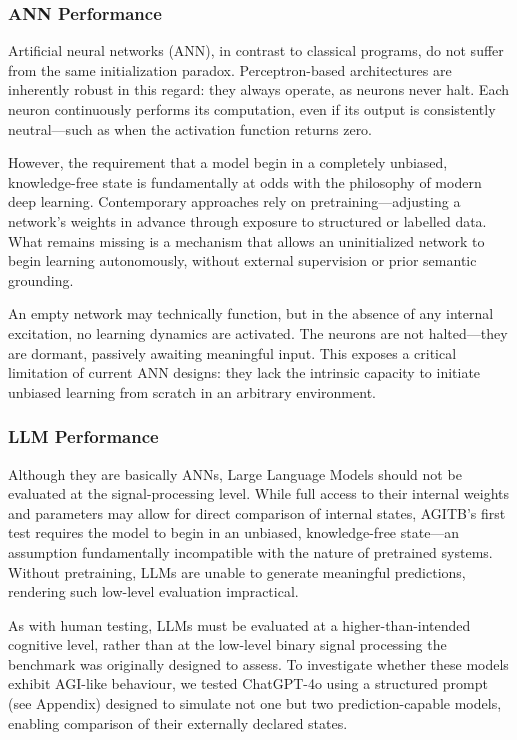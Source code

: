 \documentclass{article}
\begin{document}
	
	\subsubsection{ANN Performance}
	
	Artificial neural networks (ANN), in contrast to classical programs, do not suffer from the same initialization paradox. Perceptron-based architectures are inherently robust in this regard: they always operate, as neurons never halt. Each neuron continuously performs its computation, even if its output is consistently neutral—such as when the activation function returns zero.
	
	However, the requirement that a model begin in a completely unbiased, knowledge-free state is fundamentally at odds with the philosophy of modern deep learning. Contemporary approaches rely on pretraining—adjusting a network’s weights in advance through exposure to structured or labelled data. What remains missing is a mechanism that allows an uninitialized network to begin learning autonomously, without external supervision or prior semantic grounding.
	
	An empty network may technically function, but in the absence of any internal excitation, no learning dynamics are activated. The neurons are not halted—they are dormant, passively awaiting meaningful input. This exposes a critical limitation of current ANN designs: they lack the intrinsic capacity to initiate unbiased learning from scratch in an arbitrary environment.
	
	\subsubsection{LLM Performance}
	
	Although they are basically ANNs, Large Language Models should not be evaluated at the signal-processing level. While full access to their internal weights and parameters may allow for direct comparison of internal states, AGITB’s first test requires the model to begin in an unbiased, knowledge-free state—an assumption fundamentally incompatible with the nature of pretrained systems. Without pretraining, LLMs are unable to generate meaningful predictions, rendering such low-level evaluation impractical.
	
	As with human testing, LLMs must be evaluated at a higher-than-intended cognitive level, rather than at the low-level binary signal processing the benchmark was originally designed to assess. To investigate whether these models exhibit AGI-like behaviour, we tested ChatGPT-4o using a structured prompt (see Appendix) designed to simulate not one but two prediction-capable models, enabling comparison of their externally declared states.
	
\end{document}
